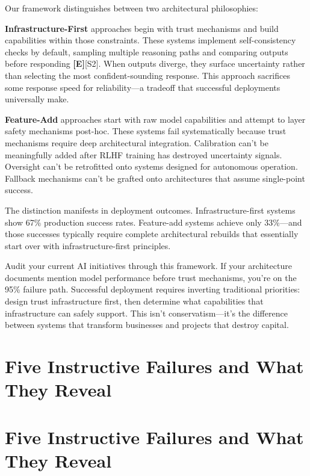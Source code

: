 \documentclass[a4paper,11pt]{article}
\newcommand{\elabel}{\textbf{\textcolor{ecolor}{[E]}}}
\begin{document}
Our framework distinguishes between two architectural philosophies:


\textbf{Infrastructure-First} approaches begin with trust mechanisms and build capabilities within those constraints. These systems implement self-consistency checks by default, sampling multiple reasoning paths and comparing outputs before responding \elabel{}\textcolor{primary}{[S2]}. When outputs diverge, they surface uncertainty rather than selecting the most confident-sounding response. This approach sacrifices some response speed for reliability—a tradeoff that successful deployments universally make.


\textbf{Feature-Add} approaches start with raw model capabilities and attempt to layer safety mechanisms post-hoc. These systems fail systematically because trust mechanisms require deep architectural integration. Calibration can't be meaningfully added after RLHF training has destroyed uncertainty signals. Oversight can't be retrofitted onto systems designed for autonomous operation. Fallback mechanisms can't be grafted onto architectures that assume single-point success.


The distinction manifests in deployment outcomes. Infrastructure-first systems show 67\% production success rates. Feature-add systems achieve only 33\%—and those successes typically require complete architectural rebuilds that essentially start over with infrastructure-first principles.


\begin{decisionbox}
Audit your current AI initiatives through this framework. If your architecture documents mention model performance before trust mechanisms, you're on the 95\% failure path. Successful deployment requires inverting traditional priorities: design trust infrastructure first, then determine what capabilities that infrastructure can safely support. This isn't conservatism—it's the difference between systems that transform businesses and projects that destroy capital.
\end{decisionbox}

\clearpage
\section{Five Instructive Failures and What They Reveal}

\section{Five Instructive Failures and What They Reveal}
\end{document}
